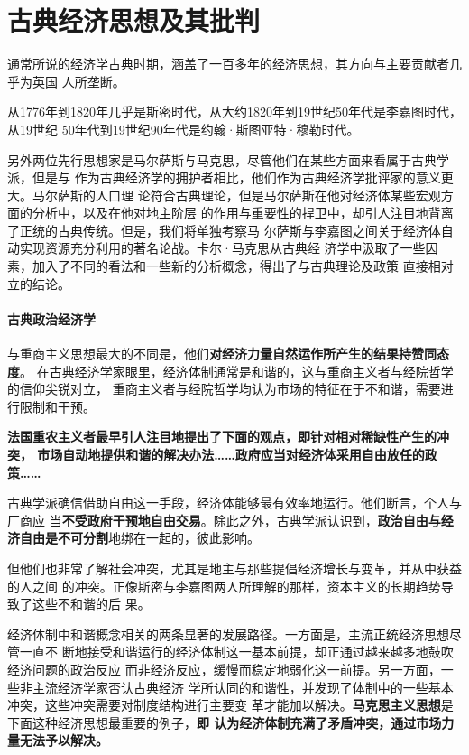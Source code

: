 \part{古典经济思想及其批判}

通常所说的经济学古典时期，涵盖了一百多年的经济思想，其方向与主要贡献者几乎为英国
人所垄断。

从1776年到1820年几乎是斯密时代，从大约1820年到19世纪50年代是李嘉图时代，从19世纪
50年代到19世纪90年代是约翰·斯图亚特·穆勒时代。

另外两位先行思想家是马尔萨斯与马克思，尽管他们在某些方面来看属于古典学派，但是与
作为古典经济学的拥护者相比，他们作为古典经济学批评家的意义更大。马尔萨斯的人口理
论符合古典理论，但是马尔萨斯在他对经济体某些宏观方面的分析中，以及在他对地主阶层
的作用与重要性的捍卫中，却引人注目地背离了正统的古典传统。但是，我们将单独考察马
尔萨斯与李嘉图之间关于经济体自动实现资源充分利用的著名论战。卡尔·马克思从古典经
济学中汲取了一些因素，加入了不同的看法和一些新的分析概念，得出了与古典理论及政策
直接相对立的结论。

\subsection*{古典政治经济学}

与重商主义思想最大的不同是，他们\textbf{对经济力量自然运作所产生的结果持赞同态度}。
在古典经济学家眼里，经济体制通常是和谐的，这与重商主义者与经院哲学的信仰尖锐对立，
重商主义者与经院哲学均认为市场的特征在于不和谐，需要进行限制和干预。

\textbf{法国重农主义者最早引人注目地提出了下面的观点，即针对相对稀缺性产生的冲突，
  市场自动地提供和谐的解决办法……政府应当对经济体采用自由放任的政策……}

古典学派确信借助自由这一手段，经济体能够最有效率地运行。他们断言，个人与厂商应
当\textbf{不受政府干预地自由交易}。除此之外，古典学派认识到，\textbf{政治自由与经
  济自由是不可分割}地绑在一起的，彼此影响。

但他们也非常了解社会冲突，尤其是地主与那些提倡经济增长与变革，并从中获益的人之间
的冲突。正像斯密与李嘉图两人所理解的那样，资本主义的长期趋势导致了这些不和谐的后
果。

经济体制中和谐概念相关的两条显著的发展路径。一方面是，主流正统经济思想尽管一直不
断地接受和谐运行的经济体制这一基本前提，却正通过越来越多地鼓吹经济问题的政治反应
而非经济反应，缓慢而稳定地弱化这一前提。另一方面，一些非主流经济学家否认古典经济
学所认同的和谐性，并发现了体制中的一些基本冲突，这些冲突需要对制度结构进行主要变
革才能加以解决。\textbf{马克思主义思想}是下面这种经济思想最重要的例子，\textbf{即
  认为经济体制充满了矛盾冲突，通过市场力量无法予以解决。}

